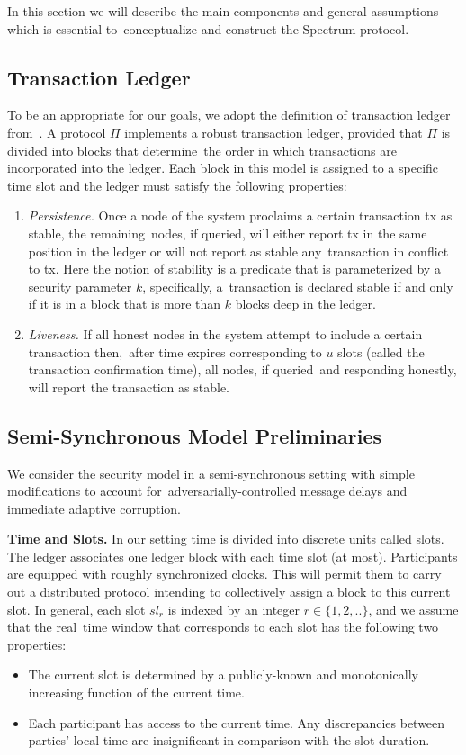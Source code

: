 In this section we will describe the main components and general assumptions which is essential to\
conceptualize and construct the Spectrum protocol.

\subsection{Transaction Ledger}\label{subsec:transaction-ledger.}
To be an appropriate for our goals, we adopt the definition of transaction ledger from~\cite{cryptoeprint:2016/889}.
A protocol $\Pi$ implements a robust transaction ledger, provided that $\Pi$ is divided into blocks that determine\
the order in which transactions are incorporated into the ledger.
Each block in this model is assigned to a specific time slot and the ledger must satisfy the following properties:
\begin{enumerate}
    \item \emph{Persistence.} Once a node of the system proclaims a certain transaction tx as stable, the remaining\
    nodes, if queried, will either report tx in the same position in the ledger or will not report as stable any\
    transaction in conflict to tx.
    Here the notion of stability is a predicate that is parameterized by a security parameter $k$, specifically, a\
    transaction is declared stable if and only if it is in a block that is more than $k$ blocks deep in the ledger.
    \item \emph{Liveness.} If all honest nodes in the system attempt to include a certain transaction then,\
    after time expires corresponding to $u$ slots (called the transaction confirmation time), all nodes, if queried\
    and responding honestly, will report the transaction as stable.
\end{enumerate}

\subsection{Semi-Synchronous Model Preliminaries}\label{subsec:the-semi-synchronous-model-preliminaries.}
We consider the security model in a semi-synchronous setting with simple modifications to account for\
adversarially-controlled message delays and immediate adaptive corruption.

\textbf{Time and Slots.}
In our setting time is divided into discrete units called slots.
The ledger associates one ledger block with each time slot (at most).
Participants are equipped with roughly synchronized clocks.
This will permit them to carry out a distributed protocol intending to collectively assign a block to this current slot.
In general, each slot $sl_r$ is indexed by an integer $r \in \{1, 2, ..\}$, and we assume that the real\
time window that corresponds to each slot has the following two properties:
\begin{itemize}
    \item The current slot is determined by a publicly-known and monotonically increasing function of the current time.
    \item Each participant has access to the current time.
    Any discrepancies between parties' local time are insignificant in comparison with the slot duration.
\end{itemize}

